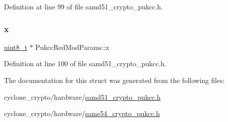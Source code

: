 Definition at line 99 of file samd51\+\_\+crypto\+\_\+pukcc.\+h.

\mbox{\label{structPukccRedModParams_af12974e9d34a4ccc9b3e2e71d87a9db0}} 
\subsubsection{\texorpdfstring{x}{x}}
{\footnotesize\ttfamily \hyperlink{stdint_8h_aba7bc1797add20fe3efdf37ced1182c5}{uint8\+\_\+t} $\ast$ Pukcc\+Red\+Mod\+Params\+::x}



Definition at line 100 of file samd51\+\_\+crypto\+\_\+pukcc.\+h.



The documentation for this struct was generated from the following files\+:\begin{DoxyCompactItemize}
\item 
cyclone\+\_\+crypto/hardware/\hyperlink{samd51__crypto__pukcc_8h}{samd51\+\_\+crypto\+\_\+pukcc.\+h}\item 
cyclone\+\_\+crypto/hardware/\hyperlink{same54__crypto__pukcc_8h}{same54\+\_\+crypto\+\_\+pukcc.\+h}\end{DoxyCompactItemize}
